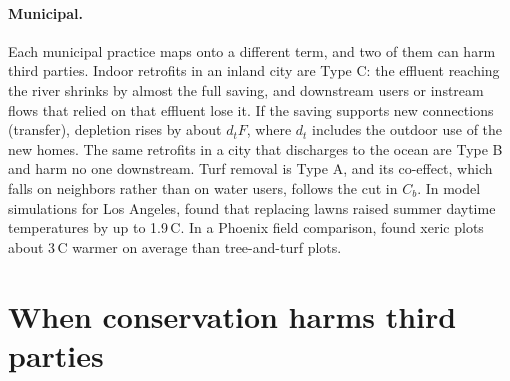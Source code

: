 \documentclass[11pt]{article}
\newcommand{\Cb}{C_b}                       %
\begin{document}
\paragraph{Municipal.} Each municipal practice maps onto a different term, and two of them can harm third parties. Indoor retrofits in an inland city are Type C: the effluent reaching the river shrinks by almost the full saving, and downstream users or instream flows that relied on that effluent lose it. If the saving supports new connections (transfer), depletion rises by about $d_t F$, where $d_t$ includes the outdoor use of the new homes. The same retrofits in a city that discharges to the ocean are Type B and harm no one downstream. Turf removal is Type A, and its co-effect, which falls on neighbors rather than on water users, follows the cut in $\Cb$. In model simulations for Los Angeles, \citet{vahmani2016} found that replacing lawns raised summer daytime temperatures by up to 1.9\,\textdegree C. In a Phoenix field comparison, \citet{saher2022} found xeric plots about 3\,\textdegree C warmer on average than tree-and-turf plots.

\section{When conservation harms third parties}\label{sec:discussion}
\end{document}
